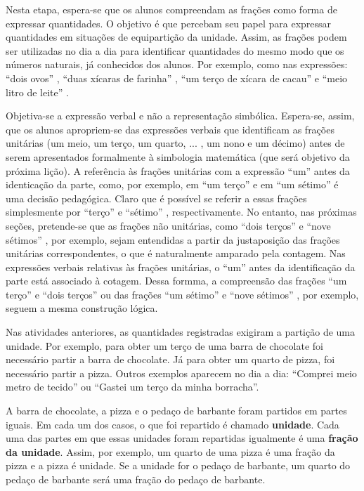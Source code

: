 \documentclass[a4paper,12pt,twoside]{book}
\begin{document}
\begin{professor*}[breakable]{}{}     
  
  Nesta etapa, espera-se que os alunos compreendam as frações como forma de expressar quantidades. O objetivo é que percebam seu papel para expressar quantidades em situações de equipartição da unidade. Assim, as frações podem ser utilizadas no dia a dia para identificar quantidades do mesmo modo que os números naturais, já conhecidos dos alunos. Por exemplo, como nas expressões:   ``dois ovos''  ,   ``duas xícaras de farinha''  ,   ``um terço de xícara de cacau''   e   ``meio litro de leite''  .  
  
  Objetiva-se a expressão verbal e não a representação simbólica. Espera-se, assim, que os alunos apropriem-se das expressões verbais que identificam as frações unitárias (um meio, um terço, um quarto, ... , um nono e um décimo) antes de serem apresentados formalmente à simbologia matemática (que será objetivo da próxima lição).  A referência às frações unitárias com a expressão   ``um''   antes da identicação da parte, como, por exemplo, em   ``um terço''   e em   ``um sétimo''   é uma decisão pedagógica. Claro que é possível se referir a essas frações simplesmente por   ``terço''   e   ``sétimo''  , respectivamente. No entanto, nas próximas seções, pretende-se que as frações não unitárias, como   ``dois terços''   e   ``nove sétimos''  , por exemplo, sejam entendidas a partir da justaposição das frações unitárias correspondentes, o que é naturalmente amparado pela contagem. Nas expressões verbais relativas às frações unitárias, o   ``um''   antes da identificação da parte está associado à cotagem. Dessa formma, a compreensão das frações   ``um terço''   e   ``dois terços''   ou das frações   ``um sétimo''   e   ``nove sétimos''  , por exemplo, seguem a mesma construção lógica.    
  
\end{professor*}  


Nas atividades anteriores, as quantidades registradas exigiram a partição de uma unidade. Por exemplo, para obter um terço de uma barra de chocolate foi necessário partir a barra de chocolate. Já para obter um quarto de pizza, foi necessário partir a pizza. Outros exemplos aparecem no dia a dia: ``Comprei meio metro de tecido'' ou ``Gastei um terço da minha borracha''.

A barra de chocolate, a pizza e o pedaço de barbante foram partidos em partes iguais. 
Em cada um dos casos, o que foi repartido é chamado {\bf unidade}. Cada uma das partes em que essas unidades foram repartidas igualmente é uma {\bf fração da unidade}. Assim, por exemplo, um quarto de uma pizza é uma fração da pizza e a pizza é unidade. Se a unidade for o pedaço de barbante, um quarto do pedaço de barbante será uma fração do pedaço de barbante.
\end{document}
